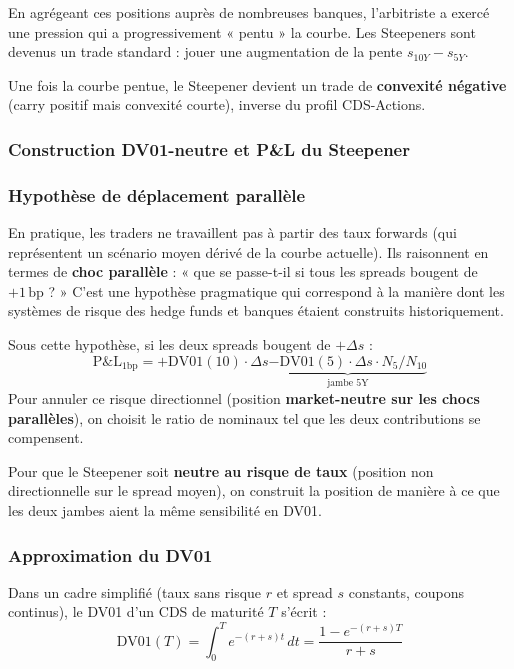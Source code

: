 En agrégeant ces positions auprès de nombreuses banques, l'arbitriste a exercé une pression qui a progressivement « pentu » la courbe. Les Steepeners sont devenus un trade standard : jouer une augmentation de la pente $s_{10Y} - s_{5Y}$.

\begin{remarque}
Une fois la courbe pentue, le Steepener devient un trade de \textbf{convexité négative} (carry positif mais convexité courte), inverse du profil CDS-Actions.
\end{remarque}

\subsubsection{Construction DV01-neutre et P\&L du Steepener}

\subsubsection*{Hypothèse de déplacement parallèle}

En pratique, les traders ne travaillent pas à partir des taux forwards (qui représentent un scénario moyen dérivé de la courbe actuelle). Ils raisonnent en termes de \textbf{choc parallèle} : « que se passe-t-il si tous les spreads bougent de $+1\,\mathrm{bp}$ ? » C'est une hypothèse pragmatique qui correspond à la manière dont les systèmes de risque des hedge funds et banques étaient construits historiquement.

Sous cette hypothèse, si les deux spreads bougent de $+\Delta s$ :
\[
\text{P\&L}_{1\mathrm{bp}} = +\mathrm{DV01}(10) \cdot \Delta s \underbrace{- \mathrm{DV01}(5) \cdot \Delta s \cdot N_5 / N_{10}}_{\text{jambe 5Y}}
\]
Pour annuler ce risque directionnel (position \textbf{market-neutre sur les chocs parallèles}), on choisit le ratio de nominaux tel que les deux contributions se compensent.

Pour que le Steepener soit \textbf{neutre au risque de taux} (position non directionnelle sur le spread moyen), on construit la position de manière à ce que les deux jambes aient la même sensibilité en DV01.

\subsubsection*{Approximation du DV01}

Dans un cadre simplifié (taux sans risque $r$ et spread $s$ constants, coupons continus), le DV01 d'un CDS de maturité $T$ s'écrit :
\[
\mathrm{DV01}(T) = \int_0^T e^{-(r+s)t} \, dt = \frac{1 - e^{-(r+s)T}}{r+s}
\]

